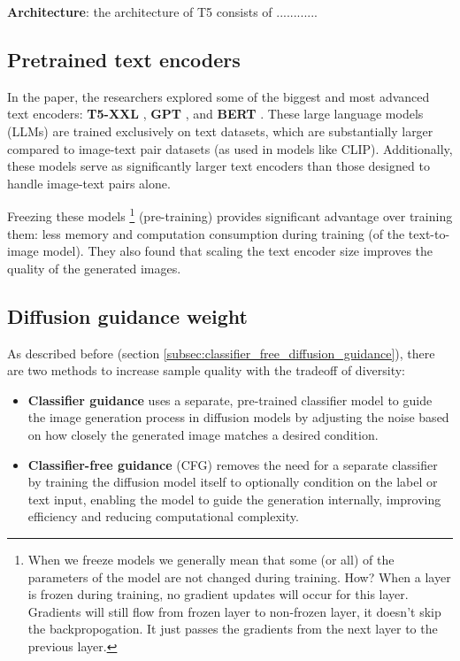 \textbf{Architecture}: the architecture of T5 consists of ............












\subsection{Pretrained text encoders}

In the paper, the researchers explored some of the biggest and most advanced text encoders: \textbf{T5-XXL} \cite{t5_model}, \textbf{GPT} \cite{gpt} \cite{mingpt} \cite{gpt_another}, and \textbf{BERT} \cite{bert}. These large language models (LLMs) are trained exclusively on text datasets, which are substantially larger compared to image-text pair datasets (as used in models like CLIP). Additionally, these models serve as significantly larger text encoders than those designed to handle image-text pairs alone.

Freezing these models \footnote{When we freeze models we generally mean that some (or all) of the parameters of the model are not changed during training. How? When a layer is frozen during training, no gradient updates will occur for this layer. Gradients will still flow from frozen layer to non-frozen layer, it doesn't skip the backpropogation. It just passes the gradients from the next layer to the previous layer.} (pre-training) provides significant advantage over training them: less memory and computation consumption during training (of the text-to-image model). They also found that scaling the text encoder size improves the quality of the generated images.














\subsection{Diffusion guidance weight}
\label{subsec:imagen_diffusion_guidance_weight}

As described before (section \ref{subsec:classifier_free_diffusion_guidance}), there are two methods to increase sample quality with the tradeoff of diversity:

\begin{itemize}
    \item \textbf{Classifier guidance} uses a separate, pre-trained classifier model to guide the image generation process in diffusion models by adjusting the noise based on how closely the generated image matches a desired condition.
    
    \item \textbf{Classifier-free guidance} (CFG) removes the need for a separate classifier by training the diffusion model itself to optionally condition on the label or text input, enabling the model to guide the generation internally, improving efficiency and reducing computational complexity.
\end{itemize}

